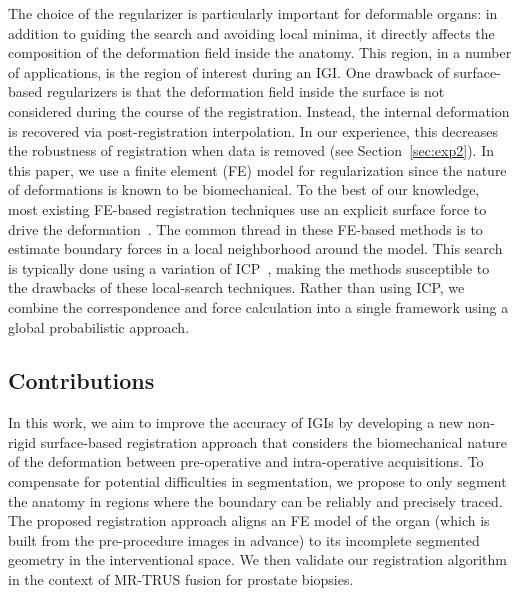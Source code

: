 \documentclass[journal]{IEEEtran}
\begin{document}
The choice of the regularizer is particularly important for deformable organs: in addition to guiding the search and avoiding local minima, it directly affects the composition of the deformation field inside the anatomy. This region, in a number of applications, is the region of interest during an IGI. One drawback of surface-based regularizers is that the deformation field inside the surface is not considered during the course of the registration.  Instead, the internal deformation is recovered via post-registration interpolation. In our experience, this decreases the robustness of registration when data is removed (see Section~\ref{sec:exp2}). In this paper, we use a finite element (FE) model for regularization since the nature of deformations is known to be biomechanical. To the best of our knowledge, most existing FE-based registration techniques use an explicit surface force to drive the deformation~\cite{Cash05a,Ferrant01a,Moradi12a,Noe10a,Rucker14a}. The common thread in these FE-based methods is to estimate boundary forces in a local neighborhood around the model. This search is typically done using a variation of ICP~\cite{Ferrant01a,Moradi12a,Rucker14a}, making the methods susceptible to the drawbacks of these local-search techniques. Rather than using ICP, we combine the correspondence and force calculation into a single framework using a global probabilistic approach.

\subsection{Contributions}
In this work, we aim to improve the accuracy of IGIs by developing a new non-rigid surface-based registration approach that considers the biomechanical nature of the deformation between pre-operative and intra-operative acquisitions. To compensate for potential difficulties in segmentation, we propose to only segment the anatomy in regions where the boundary can be reliably and precisely traced. The proposed registration approach aligns an FE model of the organ (which is built from the pre-procedure images in advance) to its incomplete segmented geometry in the interventional space. We then validate our registration algorithm in the context of MR-TRUS fusion for prostate biopsies.
\end{document}
